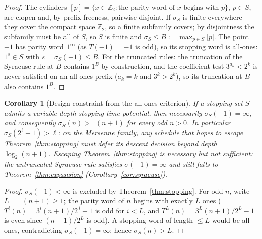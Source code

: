 \documentclass[11pt]{amsart}
\newtheorem{corollary}[theorem]{Corollary}
\theoremstyle{definition}
\theoremstyle{remark}
\newcommand{\Z}{\mathbb{Z}}
\newcommand{\Ztwo}{\Z_2}
\DeclareMathOperator{\nutwo}{\nu_2}
\begin{document}
\begin{proof}
The cylinders $[p] = \{x \in \Ztwo : \text{the parity word of } x \text{ begins with } p\}$, $p \in S$, are clopen and, by prefix-freeness, pairwise disjoint. If $\sigma_S$ is finite everywhere they cover the compact space $\Ztwo$, so a finite subfamily covers; by disjointness the subfamily must be all of $S$, so $S$ is finite and $\sigma_S \le B := \max_{p\in S}|p|$. The point $-1$ has parity word $1^\infty$ (as $T(-1) = -1$ is odd), so its stopping word is all-ones: $1^s \in S$ with $s = \sigma_S(-1) \le B$. For the truncated rules: the truncation of the Syracuse rule at $B$ contains $1^B$ by construction, and the coefficient test $3^{a_k} < 2^k$ is never satisfied on an all-ones prefix ($a_k = k$ and $3^k > 2^k$), so its truncation at $B$ also contains $1^B$.
\end{proof}

\begin{corollary}[Design constraint from the all-ones criterion]\label{cor:dichotomy}
If a stopping set $S$ admits a variable-depth stopping-time potential, then necessarily $\sigma_S(-1) = \infty$, and consequently $\sigma_S(n) > \nutwo(n+1)$ for \emph{every} odd $n > 0$. In particular $\sigma_S(2^\ell - 1) > \ell$: on the Mersenne family, any schedule that hopes to escape Theorem~\ref{thm:stopping} must defer its descent decision beyond depth $\log_2(n+1)$. Escaping Theorem~\ref{thm:stopping} is necessary but \emph{not} sufficient: the untruncated Syracuse rule satisfies $\sigma(-1) = \infty$ and still falls to Theorem~\ref{thm:expansion} (Corollary~\ref{cor:syracuse}).
\end{corollary}

\begin{proof}
$\sigma_S(-1) < \infty$ is excluded by Theorem~\ref{thm:stopping}. For odd $n$, write $L = \nutwo(n+1) \ge 1$; the parity word of $n$ begins with exactly $L$ ones ($T^i(n) = 3^i (n+1)/2^{\,i} - 1$ is odd for $i < L$, and $T^L(n) = 3^L (n+1)/2^L - 1$ is even since $(n+1)/2^L$ is odd). A stopping word of length $\le L$ would be all-ones, contradicting $\sigma_S(-1) = \infty$; hence $\sigma_S(n) > L$.
\end{proof}
\end{document}
